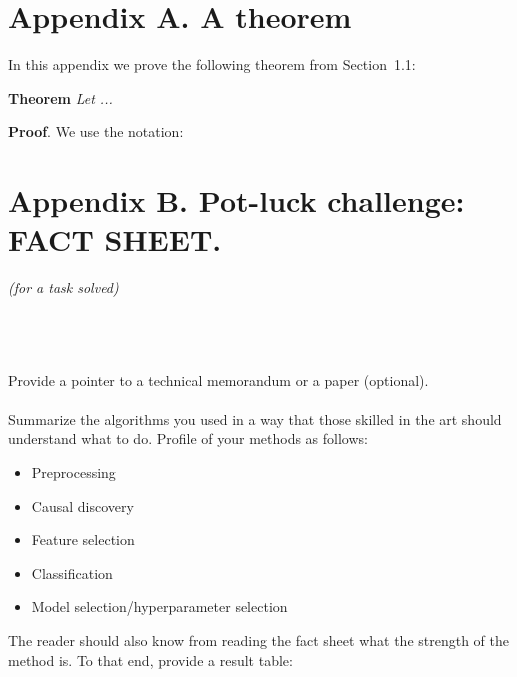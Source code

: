 \documentclass[twoside,11pt]{article}
\begin{document}
\newpage

\appendix
\section*{Appendix A. A theorem}
\label{sec:theorem}



In this appendix we prove the following theorem from
Section~1.1:

\noindent
{\bf Theorem} {\it Let ...} \hfill\BlackBox

\noindent
{\bf Proof}. We use the notation:

\section*{Appendix B. Pot-luck challenge: FACT SHEET.}
\label{sec:factsheet_v1}

{\begin{center}  \em (for a task solved) \\ \end{center} }

\\
\\
\\
 Provide a pointer to a technical memorandum or a paper (optional).\\

\\
Summarize the algorithms you used in a way that those skilled in the art should understand what to do. Profile of your methods as follows:
\begin{itemize}
\item Preprocessing
\item Causal discovery
\item Feature selection
\item Classification
\item Model selection/hyperparameter selection\\
\end{itemize}

 The reader should also know from reading the fact sheet what the strength of the method is. To that end, provide a result table:
\end{document}
